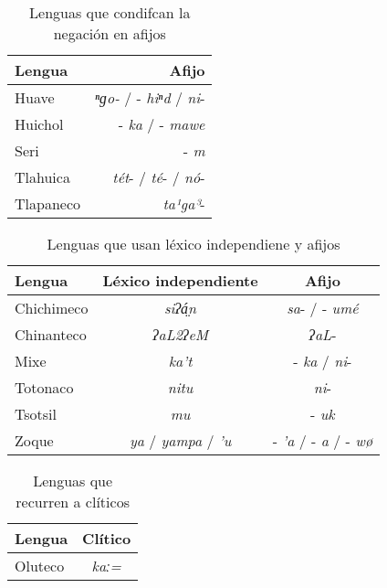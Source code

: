 \begin{table}[htbp]
\centering
\begin{tabular}{lr}
\textbf{Lengua} & \textbf{Afijo} \\
\hline
Huave & {\setmainfont{Charis SIL} \textit{ⁿɡo-}} / -{\setmainfont{Charis SIL} \textit{hiⁿd}} / {\setmainfont{Charis SIL} \textit{ni}}- \\
Huichol & -{\setmainfont{Charis SIL} \textit{ka}} / -{\setmainfont{Charis SIL} \textit{mawe}} \\
Seri  & -{\setmainfont{Charis SIL} \textit{m}} \\
Tlahuica & {\setmainfont{Charis SIL} \textit{tét}}- / {\setmainfont{Charis SIL} \textit{té}}- / {\setmainfont{Charis SIL} \textit{nó}}- \\
Tlapaneco & {\setmainfont{Charis SIL} \textit{ta¹ga³}}- \\
\hline
\end{tabular}
\caption{Lenguas que condifcan la negación en afijos}
\label{cuadro3}
\end{table}

\begin{table}[htbp]
\centering
\begin{tabular}{lcc}
\textbf{Lengua} & \textbf{Léxico independiente} & \textbf{Afijo} \\
\hline
Chichimeco & {\setmainfont{Charis SIL} \textit{siʔá̤n}} & {\setmainfont{Charis SIL} \textit{sa}}- / -{\setmainfont{Charis SIL} \textit{umé}}  \\
Chinanteco & {\setmainfont{Charis SIL} \textit{ʔaL2ʔeM}} & {\setmainfont{Charis SIL} \textit{ʔaL}}- \\
Mixe  & {\setmainfont{Charis SIL} \textit{ka’t}}  & -{\setmainfont{Charis SIL} \textit{ka}} / {\setmainfont{Charis SIL} \textit{ni}}- \\
Totonaco & {\setmainfont{Charis SIL} \textit{nitu}}  & {\setmainfont{Charis SIL} \textit{ni}}- \\
Tsotsil & {\setmainfont{Charis SIL} \textit{mu}}    & -{\setmainfont{Charis SIL} \textit{uk}} \\
Zoque & {\setmainfont{Charis SIL} \textit{ya}} / {\setmainfont{Charis SIL} \textit{yampa}} / {\setmainfont{Charis SIL} \textit{’u}}  & -{\setmainfont{Charis SIL} \textit{’a}} / -{\setmainfont{Charis SIL} \textit{a}} / -{\setmainfont{Charis SIL} \textit{wø}} \\
\hline
\end{tabular}
\caption{Lenguas que usan léxico independiene y afijos}
\label{cuadro4}
\end{table}
  
\begin{table}[htbp]
\centering  
\begin{tabular}{lc}
\textbf{Lengua} & \textbf{Clítico} \\
\hline
Oluteco & {\setmainfont{Charis SIL} \textit{kaː=}} \\
\hline
\end{tabular}
\caption{Lenguas que recurren a clíticos}
\label{cuadro5}
\end{table}
  